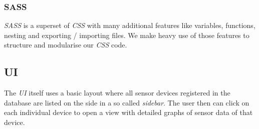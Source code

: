 \subsubsection{SASS}

\textit{SASS} is a superset of \textit{CSS} with many additional features like variables, functions,
nesting and exporting / importing files. We make heavy use of those features to structure and
modularise our \textit{CSS} code.

\subsection{UI}

The \textit{UI} itself uses a basic layout where all sensor devices registered in the database are
listed on the side in a so called \textit{sidebar}. The user then can click on each individual
device to open a view  with detailed graphs of sensor data of that device.